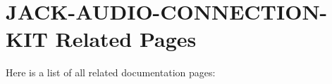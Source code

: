 \section{JACK-AUDIO-CONNECTION-KIT Related Pages}
Here is a list of all related documentation pages:\begin{CompactList}
\item {}

\item {}

\item {}

\end{CompactList}
